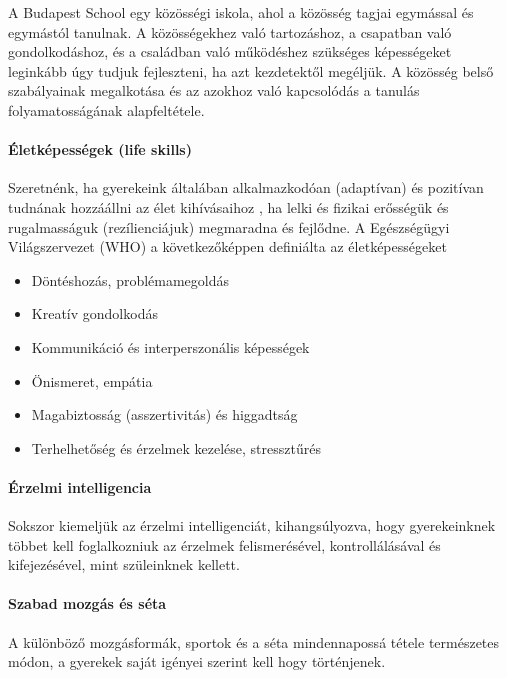 A Budapest School egy közösségi iskola, ahol a közösség tagjai egymással és egymástól tanulnak. A közösségekhez való tartozáshoz, a csapatban való gondolkodáshoz, és a családban való működéshez szükséges képességeket leginkább úgy tudjuk fejleszteni, ha azt kezdetektől megéljük. A közösség belső szabályainak megalkotása és az azokhoz való kapcsolódás a tanulás folyamatosságának alapfeltétele.

\paragraph{Életképességek (life skills)}

Szeretnénk, ha gyerekeink általában alkalmazkodóan (adaptívan) és pozitívan tudnának hozzáállni az élet kihívásaihoz , ha lelki és fizikai erősségük és rugalmasságuk (rezílienciájuk) megmaradna és fejlődne.   A Egészségügyi Világszervezet (WHO) a következőképpen definiálta \cite{oecd99lifeskills} az életképességeket
\begin{itemize}
\item Döntéshozás, problémamegoldás

\item Kreatív gondolkodás

\item Kommunikáció és interperszonális képességek

\item Önismeret, empátia

\item Magabiztosság (asszertivitás) és higgadtság

\item Terhelhetőség és érzelmek kezelése, stressztűrés
\end{itemize}
\paragraph{Érzelmi intelligencia}

Sokszor kiemeljük az érzelmi intelligenciát, kihangsúlyozva, hogy gyerekeinknek többet kell foglalkozniuk az érzelmek felismerésével, kontrollálásával és kifejezésével, mint szüleinknek kellett.

\paragraph{Szabad mozgás és séta}

A különböző mozgásformák, sportok és a séta mindennapossá tétele természetes módon, a gyerekek saját igényei szerint kell hogy történjenek.

